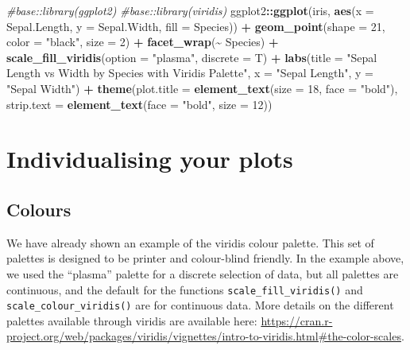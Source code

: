 \documentclass[
]{book}
\newenvironment{Shaded}{\begin{snugshade}}{\end{snugshade}}
\newcommand{\AttributeTok}[1]{\textcolor[rgb]{0.13,0.29,0.53}{#1}}
\newcommand{\CommentTok}[1]{\textcolor[rgb]{0.56,0.35,0.01}{\textit{#1}}}
\newcommand{\DecValTok}[1]{\textcolor[rgb]{0.00,0.00,0.81}{#1}}
\newcommand{\FunctionTok}[1]{\textcolor[rgb]{0.13,0.29,0.53}{\textbf{#1}}}
\newcommand{\NormalTok}[1]{#1}
\newcommand{\SpecialCharTok}[1]{\textcolor[rgb]{0.81,0.36,0.00}{\textbf{#1}}}
\newcommand{\StringTok}[1]{\textcolor[rgb]{0.31,0.60,0.02}{#1}}
\begin{document}
\begin{Shaded}
\begin{Highlighting}[]
\CommentTok{\#base::library(ggplot2)}
\CommentTok{\#base::library(viridis)}
\NormalTok{ggplot2}\SpecialCharTok{::}\FunctionTok{ggplot}\NormalTok{(iris, }\FunctionTok{aes}\NormalTok{(}\AttributeTok{x =}\NormalTok{ Sepal.Length, }\AttributeTok{y =}\NormalTok{ Sepal.Width, }\AttributeTok{fill =}\NormalTok{ Species)) }\SpecialCharTok{+}
  \FunctionTok{geom\_point}\NormalTok{(}\AttributeTok{shape =} \DecValTok{21}\NormalTok{, }\AttributeTok{color =} \StringTok{"black"}\NormalTok{, }\AttributeTok{size =} \DecValTok{2}\NormalTok{) }\SpecialCharTok{+}
  \FunctionTok{facet\_wrap}\NormalTok{(}\SpecialCharTok{\textasciitilde{}}\NormalTok{ Species) }\SpecialCharTok{+}
  \FunctionTok{scale\_fill\_viridis}\NormalTok{(}\AttributeTok{option =} \StringTok{"plasma"}\NormalTok{, }\AttributeTok{discrete =}\NormalTok{ T) }\SpecialCharTok{+}  
  \FunctionTok{labs}\NormalTok{(}\AttributeTok{title =} \StringTok{"Sepal Length vs Width by Species with Viridis Palette"}\NormalTok{,}
       \AttributeTok{x =} \StringTok{"Sepal Length"}\NormalTok{, }\AttributeTok{y =} \StringTok{"Sepal Width"}\NormalTok{)  }\SpecialCharTok{+}
  \FunctionTok{theme}\NormalTok{(}\AttributeTok{plot.title =} \FunctionTok{element\_text}\NormalTok{(}\AttributeTok{size =} \DecValTok{18}\NormalTok{, }\AttributeTok{face =} \StringTok{"bold"}\NormalTok{),}
        \AttributeTok{strip.text =} \FunctionTok{element\_text}\NormalTok{(}\AttributeTok{face =} \StringTok{"bold"}\NormalTok{, }\AttributeTok{size =} \DecValTok{12}\NormalTok{))}
\end{Highlighting}
\end{Shaded}

\section{Individualising your plots}\label{individualising-your-plots}

\subsection{Colours}\label{colours}

We have already shown an example of the viridis colour palette. This set of palettes is designed to be printer and colour-blind friendly. In the example above, we used the ``plasma'' palette for a discrete selection of data, but all palettes are continuous, and the default for the functions \texttt{scale\_fill\_viridis()} and \texttt{scale\_colour\_viridis()} are for continuous data. More details on the different palettes available through viridis are available here: \url{https://cran.r-project.org/web/packages/viridis/vignettes/intro-to-viridis.html\#the-color-scales}.
\end{document}
